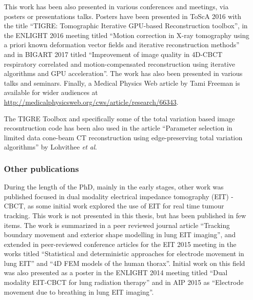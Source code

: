 This work has been also presented in various conferences and meetings, via posters or presentations talks. Posters have been presented in ToScA 2016 with the title ``TIGRE: Tomographic Iterative GPU-based Reconstruction toolbox''\cite{biguri_ander_2016_159016}, in the ENLIGHT 2016 meeting titled ``Motion correction in X-ray tomography using a priori known deformation vector fields and iterative reconstruction methods''\cite{biguri2016motion} and in BIGART 2017 titled ``Improvement of image quality in 4D-CBCT respiratory correlated and motion-compensated reconstruction using iterative algorithms and GPU acceleration''\cite{biguri2017motion}. The work has also been presented in various talks and seminars. Finally, a Medical Physics Web article by Tami Freeman is available for wider audiences at \href{http://medicalphysicsweb.org/cws/article/research/66343}{http://medicalphysicsweb.org/cws/article/research/66343}.

The TIGRE Toolbox and specifically some of the total variation based image recosntruction code has been also used in the article ``Parameter selection in limited data cone-beam CT reconstruction using edge-preserving total variation algorithms'' by Lohvithee \textit{et al}\cite{Vee}.

\subsubsection{Other publications}

During the length of the PhD, mainly in the early stages, other work was published focused in dual modality electrical impedance tomography (EIT) - CBCT, as some initial work explored the use of EIT for real time tumour tracking. This work is not presented in this thesis, but has been published in few items. The work is summarized in a peer reviewed journal article ``Tracking boundary movement and exterior shape modelling in lung EIT imaging''\cite{biguri2015tracking}, and extended in peer-reviewed conference articles for the EIT 2015 meeting in the works titled ``Statistical and deterministic approaches for electrode movement in lung EIT''\cite{biguri2015statistical} and ``4D FEM models of the human thorax''\cite{biguri20154d}. Initial work on this field was also presented as a poster in the ENLIGHT 2014 meeting titled ``Dual modality EIT-CBCT for lung radiation therapy''\cite{biguri2015dual} and in AIP 2015 as ``Electrode movement due to breathing in lung EIT imaging''\cite{biguri2015electrode}.





